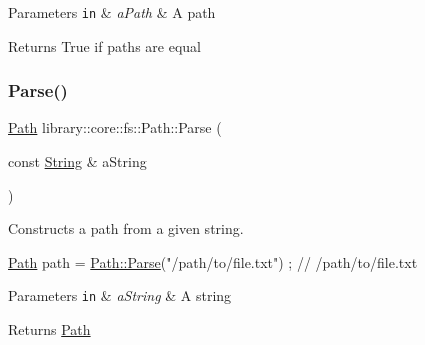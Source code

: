 \begin{DoxyParams}[1]{Parameters}
\mbox{\tt in}  & {\em a\+Path} & A path \\
\hline
\end{DoxyParams}
\begin{DoxyReturn}{Returns}
True if paths are equal 
\end{DoxyReturn}
\mbox{\label{classlibrary_1_1core_1_1fs_1_1_path_a6ba644b6609507e724c217bf2020f5ae}} 
\subsubsection{\texorpdfstring{Parse()}{Parse()}}
{\footnotesize\ttfamily \hyperlink{classlibrary_1_1core_1_1fs_1_1_path}{Path} library\+::core\+::fs\+::\+Path\+::\+Parse (\begin{DoxyParamCaption}\item[{const \hyperlink{classlibrary_1_1core_1_1types_1_1_string}{String} \&}]{a\+String }\end{DoxyParamCaption})\hspace{0.3cm}{\ttfamily [static]}}



Constructs a path from a given string. 


\begin{DoxyCode}
\hyperlink{classlibrary_1_1core_1_1fs_1_1_path_aabc4240fc08479d1bff6b9753f2b5cc2}{Path} path = \hyperlink{classlibrary_1_1core_1_1fs_1_1_path_a6ba644b6609507e724c217bf2020f5ae}{Path::Parse}(\textcolor{stringliteral}{"/path/to/file.txt"}) ; \textcolor{comment}{// /path/to/file.txt}
\end{DoxyCode}



\begin{DoxyParams}[1]{Parameters}
\mbox{\tt in}  & {\em a\+String} & A string \\
\hline
\end{DoxyParams}
\begin{DoxyReturn}{Returns}
\hyperlink{classlibrary_1_1core_1_1fs_1_1_path}{Path} 
\end{DoxyReturn}
\mbox{\label{classlibrary_1_1core_1_1fs_1_1_path_a59d9a7b2fcca844a82d22742b5a110ac}} 
